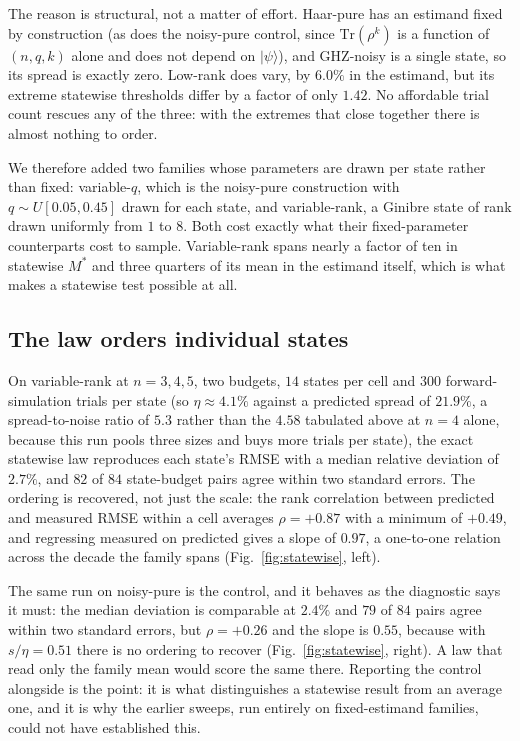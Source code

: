 \documentclass[a4paper,superscriptaddress,nofootinbib,onecolumn,nopdfoutputerror]{quantumarticle}
\begin{document}
The reason is structural, not a matter of effort. Haar-pure has an estimand fixed by
construction (as does the noisy-pure control, since \(\mathrm{Tr}(\rho^k)\) is a function of
\((n, q, k)\) alone and does not depend on \(|\psi\rangle\)), and GHZ-noisy is a single state,
so its spread is exactly zero. Low-rank does vary, by \(6.0\%\) in the estimand, but its extreme
statewise thresholds differ by a factor of only \(1.42\). No affordable trial count rescues any
of the three: with the extremes that close together there is almost nothing to order.

We therefore added two families whose parameters are drawn per state rather than fixed:
variable-\(q\), which is the noisy-pure construction with \(q \sim U[0.05, 0.45]\) drawn for each
state, and variable-rank, a Ginibre state of rank drawn uniformly from \(1\) to \(8\). Both cost
exactly what their fixed-parameter counterparts cost to sample. Variable-rank spans nearly a
factor of ten in statewise \(M^*\) and three quarters of its mean in the estimand itself, which
is what makes a statewise test possible at all.

\hypertarget{the-law-orders-individual-states}{%
\subsection{The law orders individual states}\label{the-law-orders-individual-states}}

On variable-rank at \(n = 3, 4, 5\), two budgets, \(14\) states per cell and \(300\)
forward-simulation trials per state (so \(\eta \approx 4.1\%\) against a predicted spread of \(21.9\%\), a spread-to-noise ratio of \(5.3\) rather than the \(4.58\) tabulated above at \(n = 4\)
alone, because this run pools three sizes and
buys more trials per state), the exact statewise law reproduces each state's RMSE with a median relative
deviation of \(2.7\%\), and \(82\) of \(84\) state-budget pairs agree within two standard errors.
The ordering is recovered, not just the scale: the rank correlation between predicted and measured
RMSE within a cell averages \(\rho = +0.87\) with a minimum of \(+0.49\), and regressing measured
on predicted gives a slope of \(0.97\), a one-to-one relation across the decade the family spans
(Fig.~\ref{fig:statewise}, left).

The same run on noisy-pure is the control, and it behaves as the diagnostic says it must: the
median deviation is comparable at \(2.4\%\) and \(79\) of \(84\) pairs agree within two standard
errors, but \(\rho = +0.26\) and the slope is \(0.55\), because with \(s/\eta = 0.51\) there is no
ordering to recover (Fig.~\ref{fig:statewise}, right). A law that read only the family mean would
score the same there. Reporting the control alongside is the point: it is what distinguishes a
statewise result from an average one, and it is why the earlier sweeps, run entirely on
fixed-estimand families, could not have established this.
\end{document}
